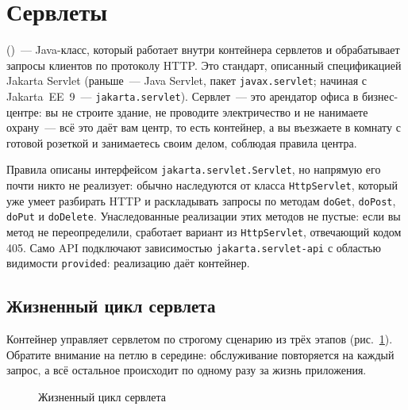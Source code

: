 \section{Сервлеты}

 ()~--- Java-класс, который работает внутри
контейнера сервлетов и обрабатывает запросы клиентов по протоколу HTTP. Это
стандарт, описанный спецификацией Jakarta Servlet (раньше~--- Java Servlet,
пакет \texttt{javax.servlet}; начиная с Jakarta~EE~9~---
\texttt{jakarta.servlet}). Сервлет~--- это арендатор офиса в бизнес-центре: вы
не строите здание, не проводите электричество и не нанимаете охрану~--- всё это
даёт вам центр, то есть контейнер, а вы въезжаете в комнату с готовой розеткой
и занимаетесь своим делом, соблюдая правила центра.

Правила описаны интерфейсом \texttt{jakarta.servlet.Servlet}, но напрямую его
почти никто не реализует: обычно наследуются от класса \texttt{HttpServlet},
который уже умеет разбирать HTTP и раскладывать запросы по методам
\texttt{doGet}, \texttt{doPost}, \texttt{doPut} и \texttt{doDelete}.
Унаследованные реализации этих методов не пустые: если вы метод не
переопределили, сработает вариант из \texttt{HttpServlet}, отвечающий кодом 405.
Само API подключают зависимостью \texttt{jakarta.servlet-api} с областью
видимости \texttt{provided}: реализацию даёт контейнер.

\subsection{Жизненный цикл сервлета}

Контейнер управляет сервлетом по строгому сценарию из трёх этапов
(рис.~\ref{fig:08-3}). Обратите внимание на петлю в середине: обслуживание
повторяется на каждый запрос, а всё остальное происходит по одному разу за
жизнь приложения.

\begin{figure}[htbp]\centering
{}
\caption{Жизненный цикл сервлета}\label{fig:08-3}
\end{figure}

